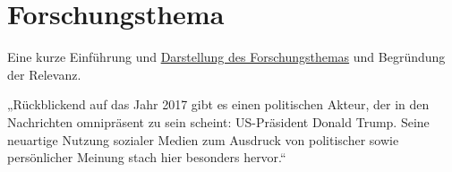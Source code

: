 
\section{Forschungsthema}
\label{sec:forschungsthema}


Eine kurze Einführung und \href{https://www.scribbr.de/anfang-abschlussarbeit/problemstellung/}{Darstellung des Forschungsthemas} und Begründung der Relevanz.


„Rückblickend auf das Jahr 2017 gibt es einen politischen
Akteur, der in den Nachrichten omnipräsent zu sein scheint: US-Präsident
 Donald Trump. Seine neuartige Nutzung sozialer Medien zum Ausdruck von
politischer sowie persönlicher Meinung stach hier besonders hervor.“


